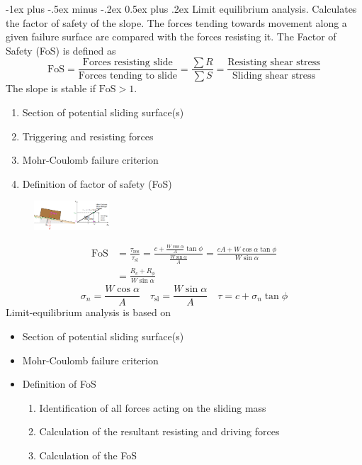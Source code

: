 \documentclass[10pt,landscape,a4paper]{article}
\makeatletter
\renewcommand{\section}{\@startsection{section}{1}{0mm}%
	{-1ex plus -.5ex minus -.2ex}%
	{0.5ex plus .2ex}%
	{\normalfont\large\bfseries}}
\makeatother
\begin{document}
\begin{multicols}{3}
	\section{Limit equilibrium analysis.}
	Calculates the factor of safety of the slope.
	The forces tending towards movement along a given failure surface are compared with the forces resisting it.
	The Factor of Safety (FoS) is defined as
	\[
		\text{FoS}=\frac{\text{Forces resisting slide}}{\text{Forces tending to slide}}=\frac{\sum R}{\sum S}=\frac{\text{Resisting shear stress}}{\text{Sliding shear stress}}
	\]
	The slope is stable if $\text{FoS}>1$.
	\begin{enumerate}
		\item Section of potential sliding surface(s)
		\item Triggering and resisting forces
		\item Mohr-Coulomb failure criterion
		\item Definition of factor of safety (FoS)
	\end{enumerate}
	\begin{figure}[H]
		\centering
		\includegraphics[width=0.25\textwidth]{limit-equilibrium-analysis}
	\end{figure}
	\begin{align*}
		\text{FoS} & =\frac{\tau_\text{res}}{\tau_\text{sl}}=\frac{c+\frac{W\cos\alpha}{A}\tan\phi}{\frac{W\sin\alpha}{A}}=\frac{cA+W\cos\alpha\tan\phi}{W\sin\alpha} \\
		           & =\frac{R_c+R_\phi}{W\sin\alpha}
	\end{align*}
	\[
		\sigma_n=\frac{W\cos\alpha}{A}\quad\tau_\text{sl}=\frac{W\sin\alpha}{A}\quad\tau=c+\sigma_n\tan\phi
	\]
	Limit-equilibrium analysis is based on
	\begin{itemize}
		\item Section of potential sliding surface(s)
		\item Mohr-Coulomb failure criterion
		\item Definition of FoS
		      \begin{enumerate}
			      \item Identification of all forces acting on the sliding mass
			      \item Calculation of the resultant resisting and driving forces
			      \item Calculation of the FoS
		      \end{enumerate}
	\end{itemize}
	

\end{multicols}
\end{document}

